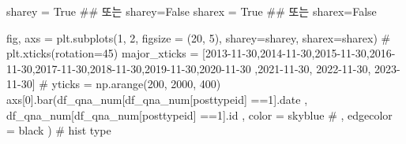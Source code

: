\documentclass[
  letterpaper,
  DIV=11,
  numbers=noendperiod]{scrartcl}
\newenvironment{Shaded}{\begin{snugshade}}{\end{snugshade}}
\newcommand{\BuiltInTok}[1]{\textcolor[rgb]{0.00,0.23,0.31}{#1}}
\newcommand{\CommentTok}[1]{\textcolor[rgb]{0.37,0.37,0.37}{#1}}
\newcommand{\DecValTok}[1]{\textcolor[rgb]{0.68,0.00,0.00}{#1}}
\newcommand{\NormalTok}[1]{\textcolor[rgb]{0.00,0.23,0.31}{#1}}
\newcommand{\OperatorTok}[1]{\textcolor[rgb]{0.37,0.37,0.37}{#1}}
\newcommand{\StringTok}[1]{\textcolor[rgb]{0.13,0.47,0.30}{#1}}
\newcommand{\VariableTok}[1]{\textcolor[rgb]{0.07,0.07,0.07}{#1}}
\begin{document}
\begin{Shaded}
\begin{Highlighting}[]
\NormalTok{sharey }\OperatorTok{=} \VariableTok{True} \CommentTok{\#\# 또는 sharey=False}
\NormalTok{sharex }\OperatorTok{=} \VariableTok{True} \CommentTok{\#\# 또는 sharex=False}

\NormalTok{fig, axs }\OperatorTok{=}\NormalTok{ plt.subplots(}\DecValTok{1}\NormalTok{, }\DecValTok{2}\NormalTok{, figsize }\OperatorTok{=}\NormalTok{ (}\DecValTok{20}\NormalTok{, }\DecValTok{5}\NormalTok{), sharey}\OperatorTok{=}\NormalTok{sharey, sharex}\OperatorTok{=}\NormalTok{sharex)}
\CommentTok{\# plt.xticks(rotation=45)}
\NormalTok{major\_xticks }\OperatorTok{=}\NormalTok{ [}\StringTok{\textquotesingle{}2013{-}11{-}30\textquotesingle{}}\NormalTok{,}\StringTok{\textquotesingle{}2014{-}11{-}30\textquotesingle{}}\NormalTok{,}\StringTok{\textquotesingle{}2015{-}11{-}30\textquotesingle{}}\NormalTok{,}\StringTok{\textquotesingle{}2016{-}11{-}30\textquotesingle{}}\NormalTok{,}\StringTok{\textquotesingle{}2017{-}11{-}30\textquotesingle{}}\NormalTok{,}\StringTok{\textquotesingle{}2018{-}11{-}30\textquotesingle{}}\NormalTok{,}\StringTok{\textquotesingle{}2019{-}11{-}30\textquotesingle{}}\NormalTok{,}\StringTok{\textquotesingle{}2020{-}11{-}30\textquotesingle{}}
\NormalTok{                ,}\StringTok{\textquotesingle{}2021{-}11{-}30\textquotesingle{}}\NormalTok{, }\StringTok{\textquotesingle{}2022{-}11{-}30\textquotesingle{}}\NormalTok{, }\StringTok{\textquotesingle{}2023{-}11{-}30\textquotesingle{}}\NormalTok{]}
\CommentTok{\# yticks = np.arange(200, 2000, 400)}
\NormalTok{axs[}\DecValTok{0}\NormalTok{].bar(df\_qna\_num[df\_qna\_num[}\StringTok{\textquotesingle{}posttypeid\textquotesingle{}}\NormalTok{] }\OperatorTok{==}\StringTok{\textquotesingle{}1\textquotesingle{}}\NormalTok{].date}
\NormalTok{        ,  df\_qna\_num[df\_qna\_num[}\StringTok{\textquotesingle{}posttypeid\textquotesingle{}}\NormalTok{] }\OperatorTok{==}\StringTok{\textquotesingle{}1\textquotesingle{}}\NormalTok{].}\BuiltInTok{id}
\NormalTok{        ,  color }\OperatorTok{=} \StringTok{\textquotesingle{}skyblue\textquotesingle{}}
        \CommentTok{\# ,  edgecolor = \textquotesingle{}black\textquotesingle{}}
\NormalTok{      ) }\CommentTok{\# hist type}


\end{Highlighting}
\end{Shaded}
\end{document}
